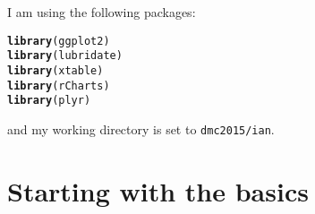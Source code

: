 \documentclass[10pt]{report}
\makeatletter
\newcommand{\hlstd}[1]{\textcolor[rgb]{0.345,0.345,0.345}{#1}}%
\newcommand{\hlkwd}[1]{\textcolor[rgb]{0.737,0.353,0.396}{\textbf{#1}}}%
\newenvironment{kframe}{%
 \def\at@end@of@kframe{}%
 \ifinner\ifhmode%
  \def\at@end@of@kframe{\end{minipage}}%
  \begin{minipage}{\columnwidth}%
 \fi\fi%
 \def\FrameCommand##1{\hskip\@totalleftmargin \hskip-\fboxsep
 \colorbox{shadecolor}{##1}\hskip-\fboxsep
     \hskip-\linewidth \hskip-\@totalleftmargin \hskip\columnwidth}%
 \MakeFramed {\advance\hsize-\width
   \@totalleftmargin\z@ \linewidth\hsize
   \@setminipage}}%
 {\par\unskip\endMakeFramed%
 \at@end@of@kframe}
\newenvironment{knitrout}{}{} %
\makeatother
\begin{document}
%


\titleheader

I am using the following packages:
\begin{knitrout}
\color{fgcolor}\begin{kframe}
\begin{alltt}
\hlkwd{library}\hlstd{(ggplot2)}
\hlkwd{library}\hlstd{(lubridate)}
\hlkwd{library}\hlstd{(xtable)}
\hlkwd{library}\hlstd{(rCharts)}
\hlkwd{library}\hlstd{(plyr)}
\end{alltt}
\end{kframe}
\end{knitrout}
and my working directory is set to \verb!dmc2015/ian!.

\section{Starting with the basics}
\end{document}
